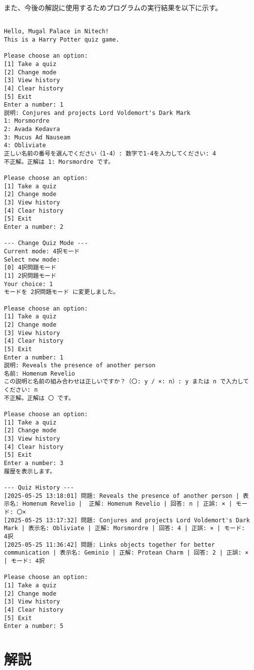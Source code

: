 \documentclass[uplatex,dvipdfmx,a4paper]{jsarticle}
\begin{document}
      

\pagebreak    


\par また、今後の解説に使用するためプログラムの実行結果を以下に示す。
\begin{lstlisting}[style=result]
   
Hello, Mugal Palace in Nitech!
This is a Harry Potter quiz game.

Please choose an option:
[1] Take a quiz
[2] Change mode
[3] View history
[4] Clear history
[5] Exit
Enter a number: 1
説明: Conjures and projects Lord Voldemort's Dark Mark
1: Morsmordre
2: Avada Kedavra
3: Mucus Ad Nauseam
4: Obliviate
正しい名前の番号を選んでください（1-4）: 数字で1-4を入力してください: 4
不正解。正解は 1: Morsmordre です。

Please choose an option:
[1] Take a quiz
[2] Change mode
[3] View history
[4] Clear history
[5] Exit
Enter a number: 2

--- Change Quiz Mode ---
Current mode: 4択モード
Select new mode:
[0] 4択問題モード
[1] 2択問題モード
Your choice: 1
モードを 2択問題モード に変更しました。

Please choose an option:
[1] Take a quiz
[2] Change mode
[3] View history
[4] Clear history
[5] Exit
Enter a number: 1
説明: Reveals the presence of another person
名前: Homenum Revelio
この説明と名前の組み合わせは正しいですか？（〇: y / ×: n）: y または n で入力してください: n    
不正解。正解は 〇 です。

Please choose an option:
[1] Take a quiz
[2] Change mode
[3] View history
[4] Clear history
[5] Exit
Enter a number: 3
履歴を表示します。

--- Quiz History ---
[2025-05-25 13:18:01] 問題: Reveals the presence of another person | 表示名: Homenum Revelio |  正解: Homenum Revelio | 回答: n | 正誤: × | モード: 〇×
[2025-05-25 13:17:32] 問題: Conjures and projects Lord Voldemort's Dark Mark | 表示名: Obliviate | 正解: Morsmordre | 回答: 4 | 正誤: × | モード: 4択
[2025-05-25 11:36:42] 問題: Links objects together for better communication | 表示名: Geminio | 正解: Protean Charm | 回答: 2 | 正誤: × | モード: 4択

Please choose an option:
[1] Take a quiz
[2] Change mode
[3] View history
[4] Clear history
[5] Exit
Enter a number: 5

\end{lstlisting}

\section{解説}
\end{document}
